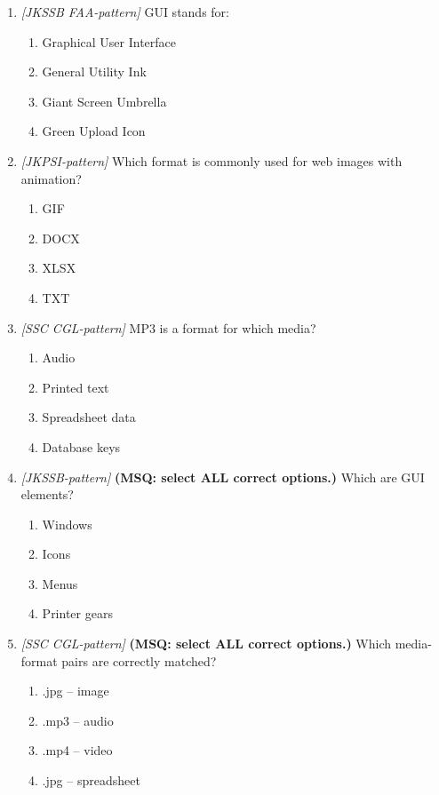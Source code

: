 \documentclass[11pt]{article}
\begin{document}
\begin{enumerate}[label=\textbf{Q\arabic*.}, leftmargin=*]
\item \textit{[JKSSB FAA-pattern]} GUI stands for:
  \begin{enumerate}[label=\Alph*.]
    \item Graphical User Interface
    \item General Utility Ink
    \item Giant Screen Umbrella
    \item Green Upload Icon
  \end{enumerate}
\item \textit{[JKPSI-pattern]} Which format is commonly used for web images with animation?
  \begin{enumerate}[label=\Alph*.]
    \item GIF
    \item DOCX
    \item XLSX
    \item TXT
  \end{enumerate}
\item \textit{[SSC CGL-pattern]} MP3 is a format for which media?
  \begin{enumerate}[label=\Alph*.]
    \item Audio
    \item Printed text
    \item Spreadsheet data
    \item Database keys
  \end{enumerate}
\item \textit{[JKSSB-pattern]} \textbf{(MSQ: select ALL correct options.)} Which are GUI elements?
  \begin{enumerate}[label=\Alph*.]
    \item Windows
    \item Icons
    \item Menus
    \item Printer gears
  \end{enumerate}
\item \textit{[SSC CGL-pattern]} \textbf{(MSQ: select ALL correct options.)} Which media-format pairs are correctly matched?
  \begin{enumerate}[label=\Alph*.]
    \item .jpg -- image
    \item .mp3 -- audio
    \item .mp4 -- video
    \item .jpg -- spreadsheet
  \end{enumerate}
\end{enumerate}
\def\JKSSBLessonID{65}\def\JKSSBAnswers{0}
\end{document}
